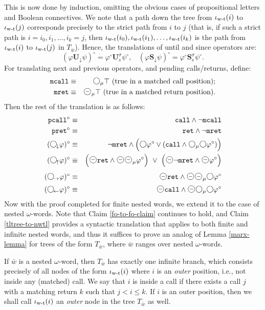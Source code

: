 \documentclass{LMCS}
\newcommand{\M}{{\mu}}
\newcommand{\w}{{\bar{w}}}
\newcommand{\dm}{\Diamond}
\newcommand{\X}{{\mathbf X}}
\newcommand{\U}{{\mathbf U}}
\renewcommand{\S}{{\mathbf S}}
\newcommand{\next}{\text{\raisebox{1pt}{$\bigcirc$}}}
\renewcommand{\X}{\next}
\newcommand{\Xd}{\X_{\!\downarrow}}
\newcommand{\Xr}{\X_{\!\rightarrow}}
\newcommand{\Yd}{\X_{\!\uparrow}}
\newcommand{\Yr}{\X_{\!\leftarrow}}
\newcommand{\Ud}{\U_{\!\downarrow}}
\newcommand{\Sd}{\S_{\!\downarrow}}
\renewcommand{\phi}{\varphi}
\newcommand{\wt}{\iota_{\text{\rm w-t}}}
\newcommand{\crc}[1]{#1^\circ}
\theoremstyle{plain}
\theoremstyle{definition}
\newcommand{\ppath}{\sigma} \newcommand{\Ul}{\U}
\newcommand{\Up}{\U^\ppath}
\newcommand{\Sp}{\S^\ppath}
\newcommand{\Us}{\Up_s}
\newcommand{\Ss}{\Sp_s}
\newcommand{\prev}{{\text{\Large $\mathbf{\circleddash}$}}}
\newcommand{\mret}{{\tt{mret}}}
\newcommand{\mcall}{{\tt{mcall}}}
\newcommand{\pret}{\tt{pret}}
\newcommand{\pcall}{\tt{pcall}}
\newcommand{\rett}{{\tt ret}}
\newcommand{\call}{{\tt call}}
\newcommand{\dmm}{\dm_{\M}}
\newcommand{\dmminus}{\dm^-}
\newcommand{\dmmminus}{\dm_{\M}^-}
\renewcommand{\dm}{\next}
\renewcommand{\dmminus}{\prev}
\renewcommand{\dmm}{\dm_\M}
\renewcommand{\dmmminus}{\dmminus_{\M}}
\begin{document}
{This is now done by induction, omitting the obvious cases of
propositional letters and Boolean connectives. 
We note that a path down the tree from $\wt(i)$ to $\wt(j)$
corresponds precisely to the strict path from $i$ to $j$ (that
is, if such a strict path is $i=i_0,i_1,\ldots,i_k=j$, then
$\wt(i_0),\wt(i_1),\ldots,\wt(i_k)$ is the path from $\wt(i)$ to
$\wt(j)$ in $T_\w$). Hence, the translations of until and since
operators are:
$$\crc{(\phi\Ud\psi)} = \crc\phi\Us\crc\psi, \ \ \ \ 
\crc{(\phi\Sd\psi)} = \crc\phi\Ss\crc\psi.$$
For translating next and previous operators, and pending calls/returns, define:
\begin{eqnarray*}
\mcall & \equiv & \dmm\top \ \text{(true in a matched call position);}\\
\mret & \equiv & \dmmminus\top \ \text{(true in a matched return position).}
\end{eqnarray*}
Then the rest of the translation is as follows:
\begin{eqnarray*}
\crc{\pcall} & \equiv & \call \wedge \neg\mcall \\
\crc{\pret} & \equiv & \rett \wedge \neg\mret \\
\crc{(\Xd\phi)} & \equiv & \neg\mret \wedge \Big(\dm\crc\phi \vee 
  (\call \wedge \dmm\dm\crc\phi)\Big)\\
\crc{(\Yd\phi)} & \equiv & \Big(\dmminus\rett \wedge
\dmminus\dmmminus\crc\phi\Big) \ \vee\  \Big(\dmminus \neg \mret
\wedge \dmminus\crc\phi\Big)\\ 
\crc{(\Xr\phi)} & \equiv & \dmminus\rett \wedge \dmminus\dmmminus\dm
\crc\phi\\ 
\crc{(\Yr\phi)} & \equiv & \dmminus\call \wedge
\dmminus\dmm\dm\crc\phi
\end{eqnarray*}
Now with the proof completed for finite nested words, we extend it to
the case of nested $\omega$-words. Note that Claim
\ref{fo-to-fo-claim} continues to hold, and Claim
\ref{tltree-to-nwtl} provides a syntactic translation that applies to
both finite and infinite nested words, and thus it suffices to  prove an
analog of Lemma \ref{marx-lemma} for trees of the form $T_\w$, where
$\w$ ranges over nested $\omega$-words. 

If $\w$ is a nested $\omega$-word, then $T_\w$ has exactly one
infinite branch, which consists precisely of all nodes of the form $\wt(i)$ where $i$ is an
{\em outer} position, i.e., not inside any (matched) call. We say that $i$ is
inside a call if there exists a call $j$ with a matching return $k$
such that $j < i \leq k$. If $i$ is an outer position, then we
shall call $\wt(i)$ an {\em outer} node in the tree $T_\w$ as well.

}
\end{document}
